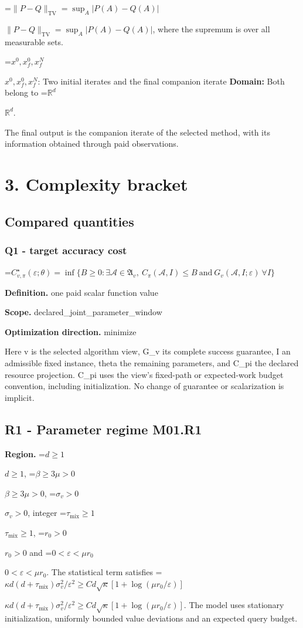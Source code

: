 \documentclass[10pt,a4paper]{article}
\newcommand{\AtlasMath}[1]{\par\begingroup\centering\setbox0=\hbox{$\displaystyle #1$}\ifdim\wd0>1.4\linewidth\typeout{ATLAS WIDE FORMULA: \the\wd0}\fi\ifdim\wd0>\linewidth\resizebox{\linewidth}{!}{\box0}\else\box0\fi\par\endgroup}
\newcommand{\AtlasInlineMath}[1]{\begingroup\setbox0=\hbox{$#1$}\ifdim\wd0>.4\linewidth\endgroup\AtlasMath{#1}\else\endgroup$#1$\fi}
\begin{document}
\AtlasInlineMath{\|P-Q\|_{\mathrm{TV}}=\sup_A|P(A)-Q(A)|}, where the supremum is over all measurable sets.

\AtlasInlineMath{x^0,x_f^0,x_f^N}: Two initial iterates and the final companion iterate \textbf{Domain:} Both belong to \AtlasInlineMath{\mathbb{R}^d}.

The final output is the companion iterate of the selected method, with its information obtained through paid observations.

\section{3. Complexity bracket}
\subsection{Compared quantities}
\subsubsection{Q1 - target accuracy cost}
\AtlasMath{C^\star_{v,\pi}(\varepsilon;\theta)=\inf\{B\ge0:\exists\mathcal A\in\mathfrak A_v,\ C_\pi(\mathcal A,I)\le B\ \text{and}\ G_v(\mathcal A,I;\varepsilon)\ \forall I\}}
\textbf{Definition.} one paid scalar function value

\textbf{Scope.} declared\_joint\_parameter\_window

\textbf{Optimization direction.} minimize

Here v is the selected algorithm view, G\_v its complete success guarantee, I an admissible fixed instance, theta the remaining parameters, and C\_pi the declared resource projection. C\_pi uses the view's fixed-path or expected-work budget convention, including initialization. No change of guarantee or scalarization is implicit.

\subsection{R1 - Parameter regime M01.R1}
\textbf{Region.} \AtlasInlineMath{d\ge1}, \AtlasInlineMath{\beta\ge3\mu>0}, \AtlasInlineMath{\sigma_v>0}, integer \AtlasInlineMath{\tau_{\mathrm{mix}}\ge1}, \AtlasInlineMath{r_0>0} and \AtlasInlineMath{0<\varepsilon<\mu r_0}. The statistical term satisfies \AtlasInlineMath{\kappa d(d+\tau_{\mathrm{mix}})\sigma_v^2/\varepsilon^2\ge Cd\sqrt\kappa[1+\log(\mu r_0/\varepsilon)]}. The model uses stationary initialization, uniformly bounded value deviations and an expected query budget.
\end{document}
